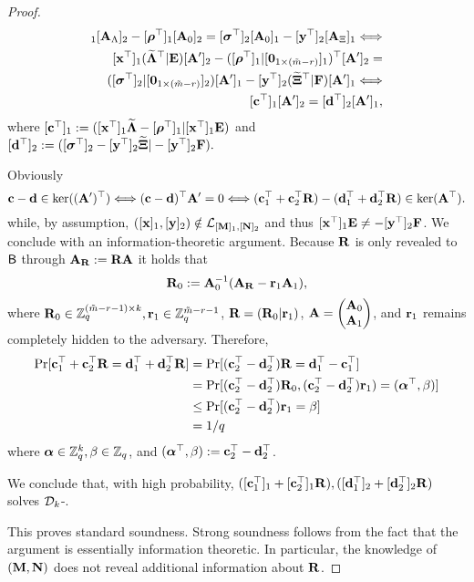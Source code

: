 \begin{proof}
\begin{align*}
[\vecb{x}^\top]_1 [\matr{A}_\Lambda]_2  - [\grkb{\rho}^\top]_1[\matr{A}_0]_2=  [\grkb{\sigma}^\top]_2 [\matr{A}_0]_1-[\vecb{y}^\top]_2 [\matr{A}_\Xi]_1   \Longleftrightarrow\\
[\vecb{x}^\top]_1 (\widetilde{\matr{\Lambda}}^{\top}\cat \matr{E})[\matr{A}']_2  - ([\grkb{\rho}^{\top}]_1\cat[\matr{0}_{1\times(\tm-r)}]_1)^\top[\matr{A}']_2 = \\
( [\grkb{\sigma}^\top]_2 \cat [\matr{0}_{1\times(\tm-r)}]_2)  [\matr{A}']_1-[\vecb{y}^\top]_2 (\widetilde{\matr{\Xi}}^{\top}\cat \matr{F} ) [\matrA']_1  \Longleftrightarrow\\
[\vecb{c}^{\top}]_1 [\matrA']_2=[\vecb{d}^{\top}]_2 [\matrA']_1,
\end{align*}
 where $[\mathbf{c}^{\top}]_1:=([\mathbf{x}^{\top}]_1\widetilde{\mathbf{{\Lambda}}}-[{\boldsymbol \rho}^{\top}]_1| [\mathbf{x}^{\top}]_1 \mathbf{{E}})$ and $ [\mathbf{d}^{\top}]_2:=([{\boldsymbol \sigma}^{\top}]_2-[\mathbf{y}^{\top}]_2\widetilde{\mathbf{{\Xi}}}| -[\mathbf{y}^{\top}]_2 \mathbf{{F}}).$

Obviously 
$$\mathbf{c}-\mathbf{d} \in \ker((\mathbf{{A}}')^{\top}) 
\Longleftrightarrow (\mathbf{c}-\mathbf{d})^{\top} \mathbf{{A}}'=0 \Longleftrightarrow (\mathbf{c}_1^{\top}+\mathbf{c}_2^{\top} \mathbf{{R}})-(\mathbf{d}_1^{\top}+\mathbf{d}_2^{\top} \mathbf{{R}})
 \in \ker(\mathbf{{A}}^{\top}).$$
while, by assumption,  $([\mathbf{x}]_1,[\mathbf{y}]_2) \notin \mathcal{L}_{[\mathbf{{M}}]_1,[\mathbf{{N}}]_2}$ and thus
$[\mathbf{x}^{\top}]_1 \mathbf{{E}} \neq -[\mathbf{y}^{\top}]_2 \mathbf{{F}}$.
 We conclude with an information-theoretic argument. Because $\mathbf{{R}}$ is only revealed to $\mathsf{B}$ through $\mathbf{{A}}_{\mathbf{{R}}}:=\mathbf{{R}}\mathbf{{A}}$ it holds that
$$
\mathbf{{R}}_0 := \mathbf{{A}}_0^{-1}(\mathbf{{A}}_{\mathbf{{R}}}-\mathbf{{r}}_1\mathbf{{A}}_1),
$$
where $\mathbf{{R}}_0\in\mathbb{Z}_q^{(\tilde{m}-r-1)\times k},\mathbf{{r}}_1\in\mathbb{Z}_q^{\tilde{m}-r-1}$, $\mathbf{{R}}=(\mathbf{{R}}_0|\mathbf{r}_1)$, $\mathbf{{A}}=\left(\begin{matrix}\mathbf{{A}}_0\\\mathbf{{A}}_1\end{matrix}\right)$, and $\mathbf{r}_1$ remains completely hidden to the adversary.
Therefore,
\begin{align*}
\Pr[\mathbf{c}_1^{\top}+\mathbf{c}_2^{\top} \mathbf{{R}} = \mathbf{d}_1^{\top}+\mathbf{d}_2^{\top} \mathbf{{R}}] &=
\Pr[(\mathbf{c}_2^\top-\mathbf{d}_2^\top)\mathbf{{R}} = \mathbf{d}^\top_1-\mathbf{c}^\top_1]\\
&= \Pr[(\mathbf{c}_2^\top-\mathbf{d}_2^\top)\mathbf{{R}}_0,(\mathbf{c}_2^\top-\mathbf{d}_2^\top)\mathbf{r}_1)=({\boldsymbol \alpha}^\top,\beta)]\\
&\leq \Pr[(\mathbf{c}_2^\top-\mathbf{d}_2^\top)\mathbf{r}_1 = \beta]\\
&= 1/q
\end{align*}
where ${\boldsymbol \alpha}\in\mathbb{Z}_q^k,\beta\in\mathbb{Z}_q$, and $({\boldsymbol \alpha}^\top,\beta):=\mathbf{c}_2^\top-\mathbf{d}_2^\top$.

We conclude that, with high probability, $([\mathbf{c}_1^{\top}]_1+[\mathbf{c}_2^{\top}]_1 \mathbf{{R}}),([\mathbf{d}_1^{\top}]_2+[\mathbf{d}_2^{\top}]_2 \mathbf{{R}})$ 
solves $\mathcal{D}_{k}$-\skermdh{}.

This proves standard soundness. Strong soundness follows from the fact that the argument is essentially information theoretic. In particular, the knowledge of $(\mathbf{{M}},\mathbf{{N}})$ does not reveal additional information about $\mathbf{{R}}$. 
\end{proof}
